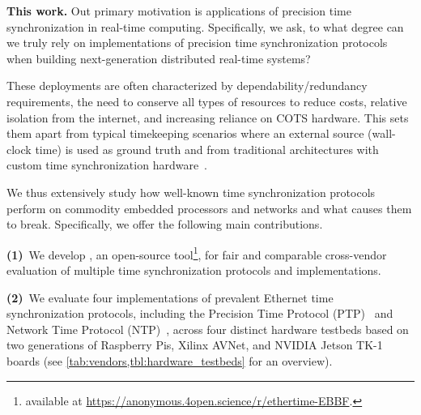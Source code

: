 \textbf{This work.}
Out primary motivation is applications of precision time synchronization in real-time computing.
Specifically, we ask, to what degree can we truly rely on implementations of precision time synchronization protocols
when building next-generation distributed real-time systems? %

These deployments %
are often %
characterized by dependability/redundancy requirements,
the need to conserve all types of resources to reduce costs,
relative isolation from the internet, %
and increasing reliance on COTS hardware.
This sets them apart from typical timekeeping scenarios where an external source
(wall-clock time) is used as ground truth
and from traditional architectures with custom time synchronization hardware~\cite{wensley1978sift,hopkins1978ftmp}.

We thus extensively study how well-known time synchronization protocols perform
on commodity embedded processors and networks and what causes them to break.
Specifically, we offer the following main contributions.

\textbf{(1)}~We develop \toolName{}, an open-source tool\footnote{available
at \url{https://anonymous.4open.science/r/ethertime-EBBF}.},
for fair and comparable cross-vendor evaluation of multiple time
synchronization protocols and implementations.

\textbf{(2)}~We evaluate %
four implementations of prevalent Ethernet time synchronization protocols, %
including the Precision Time Protocol (PTP)~\cite{ptp-spec} and Network Time Protocol (NTP)~\cite{ntpv4-spec},
across four distinct hardware testbeds
based on two generations of Raspberry Pis,
Xilinx AVNet, and NVIDIA Jetson TK-1 boards (see \cref{tab:vendors,tbl:hardware_testbeds} for an overview).

